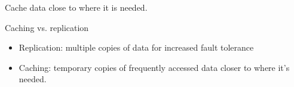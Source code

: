 \begin{slide}
	
	
	Cache data close to where it is needed.
	\bigskip
	
	Caching vs. replication
	\begin{itemize}
		\item Replication: multiple copies of data for increased fault tolerance
		\item Caching: temporary copies of frequently accessed data closer to where it’s needed.
	\end{itemize}
	
\end{slide}
















